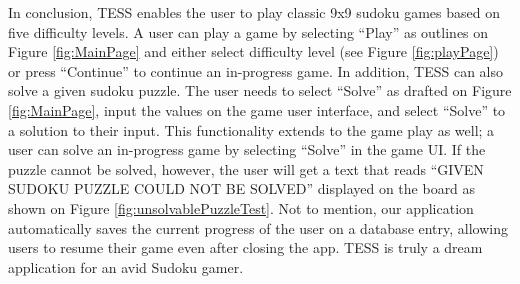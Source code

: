 \documentclass{article}
\begin{document}
In conclusion, TESS enables the user to play classic 9x9 sudoku games based on five difficulty levels. A user can play a game by selecting “Play” as outlines on Figure \ref{fig:MainPage} and either select difficulty level (see Figure \ref{fig:playPage}) or press “Continue” to continue an in-progress game. In addition, TESS can also solve a given sudoku puzzle. The user needs to select “Solve” as drafted on Figure \ref{fig:MainPage}, input the values on the game user interface, and select “Solve” to a solution to their input. This functionality extends to the game play as well; a user can solve an in-progress game by selecting “Solve” in the game UI. If the puzzle cannot be solved, however, the user will get a text that reads “GIVEN SUDOKU PUZZLE COULD NOT BE SOLVED” displayed on the board as shown on Figure \ref{fig:unsolvablePuzzleTest}. Not to mention, our application automatically saves the current progress of the user on a database entry, allowing users to resume their game even after closing the app. TESS is truly a dream application for an avid Sudoku gamer.






 
\end{document}
